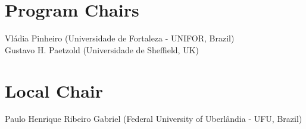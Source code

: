 \documentclass[english, titlepage, a4paper]{lni}
\begin{document}




\newpage





\newpage



\section*{Program Chairs}
Vl\'{a}dia Pinheiro (Universidade de Fortaleza - UNIFOR, Brazil)\\
Gustavo H. Paetzold (Universidade de Sheffield, UK)

\section*{Local Chair}
Paulo Henrique Ribeiro Gabriel (Federal University of Uberl\^{a}ndia - UFU, Brazil) \\
\end{document}
